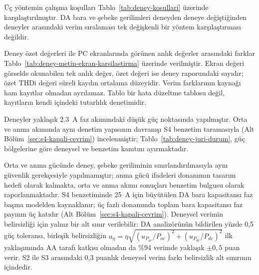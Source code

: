 Üç yöntemin çalışma koşulları Tablo~\ref{tab:deney-kosullari} üzerinde karşılaştırılmıştır. DA bara ve şebeke gerilimleri deneyden deneye değiştiğinden deneyler arasındaki verim sıralaması tek değişkenli bir yöntem karşılaştırması değildir.

Deney özet değerleri ile PC ekranlarında görünen anlık değerler arasındaki farklar Tablo~\ref{tab:deney-metin-ekran-karsilastirma} üzerinde verilmiştir. Ekran değeri görselde okunabilen tek anlık değer, özet değeri ise deney raporundaki sayıdır; özet THDi değeri süreli kaydın ortalama düzeyidir. Verim farklarının kaynağı ham kayıtlar olmadan ayrılamaz. Tablo bir hata düzeltme tablosu değil, kayıtların kendi içindeki tutarlılık denetimidir.

Deneyler yaklaşık \SI{2.3}{\ampere} faz akımındaki düşük güç noktasında yapılmıştır. Orta ve anma akımında aynı denetim yapısının davranışı S4 benzetim taramasıyla (Alt Bölüm~\ref{sec:s4-kapali-cevrim}) incelenmiştir; Tablo~\ref{tab:deney-juri-durum}, güç bölgelerine göre deneysel ve benzetim kanıtını ayırmaktadır.

Orta ve anma gücünde deney, şebeke geriliminin sınırlandırılmasıyla aynı güvenlik gerekçesiyle yapılmamıştır; anma gücü ifadeleri donanımın tasarım hedefi olarak kalmakta, orta ve anma akımı sonuçları benzetim bulgusu olarak raporlanmaktadır. S4 benzetiminde \SI{25}{\ampere} için büyütülen DA bara kapasitansı faz başına modelden kaynaklanır; üç fazlı donanımda toplam bara kapasitansı faz payının üç katıdır (Alt Bölüm~\ref{sec:s4-kapali-cevrim}). Deneysel verimin belirsizliği için yalnız bir alt sınır verilebilir: DA analizörünün bildirilen yüzde 0,5 güç toleransı, birleşik belirsizliğin $u_{\eta}=\eta\sqrt{(u_{P_{ac}}/P_{ac})^2+(u_{P_{dc}}/P_{dc})^2}$ ilk yaklaşımında AA tarafı katkısı olmadan da \%94 verimde yaklaşık $\pm0{,}5$ puan verir. S2 ile S3 arasındaki 0,3 puanlık deneysel verim farkı belirsizlik alt sınırının içindedir.

